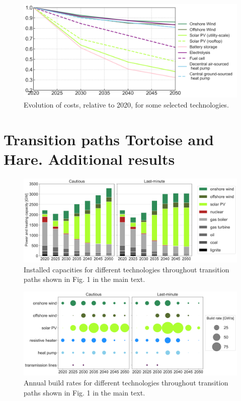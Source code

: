\documentclass[3p]{elsarticle} %
\begin{document}
\begin{figure}[!h]
\centering
\includegraphics[width=12cm]{figures/cost_evolution.png}
\caption{Evolution of costs, relative to 2020, for some selected technologies. } \label{fig_cost_evolution} 
\end{figure}
 

\FloatBarrier

\section{Transition paths Tortoise and Hare. Additional results}

\begin{figure}[!h]
	\centering
	\includegraphics[width=\columnwidth]{figures/installed_capacity_w_TYNDP.png}
	\caption{Installed capacities for different technologies throughout transition paths shown in Fig. 1 in the main text.} \label{fig_installed_capacity} 
\end{figure}

\begin{figure}[!h]
\centering
\includegraphics[width=\columnwidth]{figures/build_rates_w_TYNDP.png}
\caption{Annual build rates for different technologies throughout transition paths shown in Fig. 1 in the main text. } \label{fig_build_rates} 
\end{figure}
\end{document}
